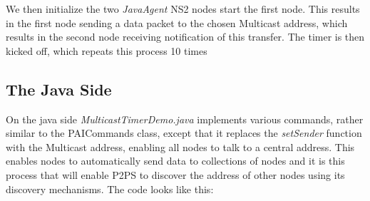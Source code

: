 We then initialize the two \emph{JavaAgent} NS2 nodes
start the first node. This results in the first node sending a data
packet to the chosen Multicast address, which results in the second node
receiving notification of this transfer. The timer is then kicked off,
which repeats this process 10 times

\subsection{The Java Side}
\label{jni:javaside}

On the java side \emph{MulticastTimerDemo.java} implements various
commands, rather similar to the PAICommands class, except that it
replaces the \emph{setSender} function with the Multicast address,
enabling all nodes to talk to a central address. This enables nodes to
automatically send data to collections of nodes and it is this process
that will enable P2PS to discover the address of other nodes using
its discovery mechanisms. The code looks like this:


